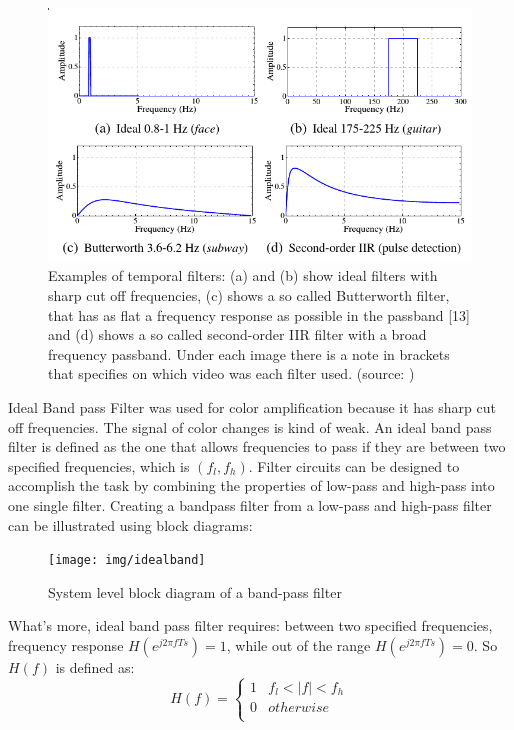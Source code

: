 \begin{figure}[!htb]
	\centering
	\includegraphics[scale=0.55]{img/eulerian/temperial}
	\caption{Examples of temporal filters:  (a) and (b) show ideal filters with sharp cut off frequencies, (c) shows a so called Butterworth filter, that has as flat a frequency response as possible in the passband [13] and (d) shows a so called second-order IIR filter with a broad frequency passband. Under each image there is a note in brackets that specifies on which video was each filter used. (source: \cite{Christiano})}
\end{figure}

\newpage
Ideal Band pass Filter \cite{Christiano} was used for color amplification because it has sharp cut off frequencies. The signal of color changes is kind of weak. An ideal band pass filter is defined as the one that allows frequencies to pass if they are between two specified frequencies, which is $(f_{l}, f_{h})$. Filter circuits can be designed to accomplish the task by combining the properties of low-pass and high-pass into one single filter. Creating a bandpass filter from a low-pass and high-pass filter can be illustrated using block diagrams: \\

\begin{figure}[!htb]
	\centering
	\texttt{[image: img/idealband]}
	\caption{System level block diagram of a band-pass filter}
\end{figure}

What's more, ideal band pass filter requires: between two specified frequencies, frequency response $H\left ( e^{j2\pi fTs } \right )=1$, while out of the range $H\left ( e^{j2\pi fTs } \right )=0$. So $H(f)$ is defined as:
\[
    H(f)=\left\{
                \begin{array}{ll}
                  1 & f_{l} <|f|<  f_{h}\\
                  0 & otherwise\\
                \end{array}
              \right.
\]
  
